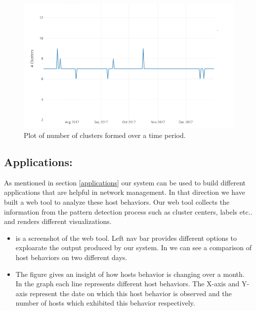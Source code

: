 \begin{figure}[t]
	\centerline{\includegraphics{constant.png}}
	\caption{ Plot of number of clusters formed over a time period.}%
\end{figure}




\subsection{Applications:}

 As mentioned in section \ref{applications} our system can be used to build different applications that are helpful in network management. In that direction we have built a web tool to analyze these host behaviors. Our web tool collects the information from the pattern detection process such as cluster centers, labels etc.. and renders different visualizations.
 
 \begin{itemize}
 	\item {} is a screenshot of the web tool. Left nav bar provides different options to exploarate the output produced by our system. In  we can see a comparison of host behaviors on two different days.
 	
 	\item The figure  gives an insight of how hosts behavior is changing over a month.
 	In the graph each line represents different host behaviors. The X-axis and Y-axis
 	represent the date on which this host behavior is observed and the number of hosts
 	which exhibited this behavior respectively.
 	
 \end{itemize}
 
